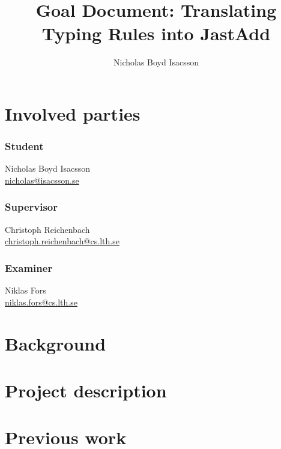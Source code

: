 \documentclass{article}
\title{Goal Document: Translating Typing Rules into JastAdd}
\author{Nicholas Boyd Isacsson}
\begin{document}
\maketitle

\section{Involved parties}
\subsubsection*{Student}
  Nicholas Boyd Isacsson \\
  \href{mailto:nicholas@isacsson.se}{nicholas@isacsson.se}

\subsubsection*{Supervisor}
  Christoph Reichenbach \\
  \href{mailto:christoph.reichenbach@cs.lth.se}{christoph.reichenbach@cs.lth.se}

\subsubsection*{Examiner}
  Niklas Fors \\
  \href{mailto:niklas.fors@cs.lth.se}{niklas.fors@cs.lth.se}

\section{Background}


\section{Project description}





\section{Previous work}
\end{document}
